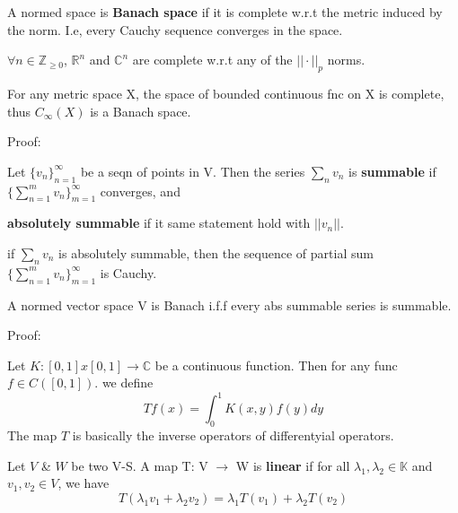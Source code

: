 \begin{definition}
    A normed space is \textbf{Banach  space} if it is complete w.r.t the metric induced by the norm. I.e, every Cauchy sequence converges in the space.
\end{definition}

\begin{example}
    $\forall n \in \mathbb{Z}_{\geq 0}$, $\mathbb{R}^n$ and $\mathbb{C}^n$ are complete w.r.t any of the $||\cdot||_p$ norms.
\end{example}

\begin{theorem}
For any metric space X, the space of bounded continuous fnc on X is complete, thus $C_\infty(X)$ is a Banach space.
\end{theorem}

Proof: 

\begin{definition}
    Let $\{v_n\}_{n=1}^{\infty}$ be a seqn of points in V. Then the series $\sum_{n} v_n$ is \textbf{summable} if $\{\sum_{n=1}^{m} v_n\}_{m=1}^{\infty}$ converges, and 
    
    \textbf{absolutely summable} if it same statement hold with $||v_n||$.
\end{definition}

\begin{proposition}
    if $\sum_n v_n$ is absolutely summable, then the sequence of partial sum $\{\sum_{n=1}^{m}v_n\}_{m=1}^{\infty}$ is Cauchy.
\end{proposition}

\begin{theorem}
A normed vector space V is Banach i.f.f every abs summable series is summable.
\end{theorem}

Proof:




\begin{example}
Let $ K:[0,1]x[0,1] \to \mathbb{C}$ be a continuous function. Then for any func $f \in C([0,1])$. we define \[Tf(x) = \int_{0}^{1} K(x,y)f(y)dy\] The map $T$ is basically the inverse operators of differentyial operators.
\end{example}


\begin{definition}
Let $V$ \& $W$ be two V-S. A map T: V $\to$ W is \textbf{linear} if for all $\lambda_1, \lambda_2 \in \mathbb{K}$ and $v_1, v_2 \in V$, we have \[T(\lambda_1 v_1 + \lambda_2 v_2) = \lambda_1 T(v_1) + \lambda_2 T(v_2)\]
\end{definition}

